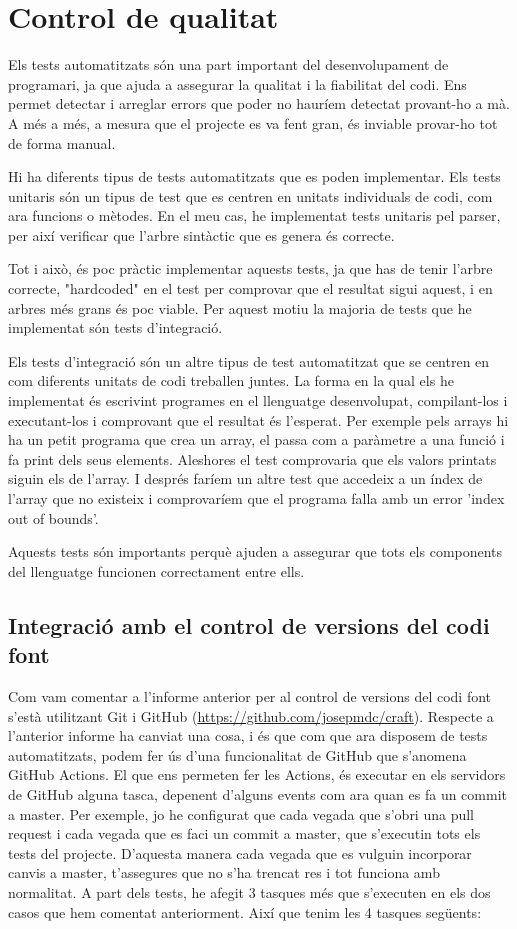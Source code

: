 ﻿\documentclass{article}
\begin{document}
\section{Control de qualitat}
Els tests automatitzats són una part important del desenvolupament de
programari, ja que ajuda a assegurar la qualitat i la fiabilitat del codi. Ens
permet detectar i arreglar errors que poder no hauríem detectat provant-ho a mà.
A més a més, a mesura que el projecte es va fent gran, és inviable provar-ho tot
de forma manual.

Hi ha diferents tipus de tests automatitzats que es poden implementar. Els tests
unitaris són un tipus de test que es centren en unitats individuals de codi, com
ara funcions o mètodes. En el meu cas, he implementat tests unitaris pel parser,
per així verificar que l'arbre sintàctic que es genera és correcte. 

Tot i això, és poc pràctic implementar aquests tests, ja que has de tenir
l'arbre correcte, "hardcoded" en el test per comprovar que el resultat sigui
aquest, i en arbres més grans és poc viable. Per aquest motiu la majoria de
tests que he implementat són tests d'integració.

Els tests d'integració són un altre tipus de test automatitzat que se centren en
com diferents unitats de codi treballen juntes. La forma en la qual els he 
implementat és escrivint programes en el llenguatge desenvolupat, compilant-los 
i executant-los i comprovant que el resultat és l'esperat. Per exemple pels 
arrays hi ha un petit programa que crea un array, el passa com a paràmetre a una
funció i fa print dels seus elements. Aleshores el test comprovaria que els 
valors printats siguin els de l'array. I després faríem un altre test que 
accedeix a un índex de l'array que no existeix i comprovaríem que el programa 
falla amb un error 'index out of bounds'.

Aquests tests són importants perquè ajuden a assegurar que tots els components
del llenguatge funcionen correctament entre ells.

\subsection{Integració amb el control de versions del codi font}

Com vam comentar a l'informe anterior per al control de versions del codi font
s'està utilitzant Git i GitHub (\url{https://github.com/josepmdc/craft}).
Respecte a l'anterior informe ha canviat una cosa, i és que com que ara disposem
de tests automatitzats, podem fer ús d'una funcionalitat de GitHub que s'anomena
GitHub Actions. El que ens permeten fer les Actions, és executar en els
servidors de GitHub alguna tasca, depenent d'alguns events com ara quan es fa un
commit a master. Per exemple, jo he configurat que cada vegada que s'obri una
pull request i cada vegada que es faci un commit a master, que s'executin tots
els tests del projecte. D'aquesta manera cada vegada que es vulguin incorporar
canvis a master, t'assegures que no s'ha trencat res i tot funciona amb
normalitat. A part dels tests, he afegit 3 tasques més que s'executen en els 
dos casos que hem comentat anteriorment. Així que tenim les 4 tasques següents:
\end{document}
